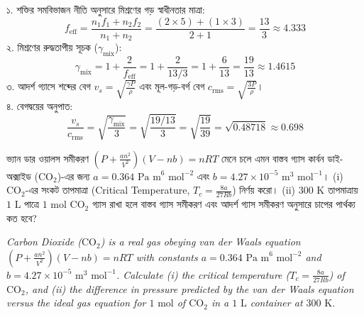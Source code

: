 \documentclass[12pt, a4paper]{article}
\begin{document}
{%
\begin{tcolorbox}[solutionbox={সমাধান (Solution)}]
\noindent
১. শক্তির সমবিভাজন নীতি অনুসারে মিশ্রণের গড় স্বাধীনতার মাত্রা:
\[ f_{\text{eff}} = \frac{n_1 f_1 + n_2 f_2}{n_1 + n_2} = \frac{(2 \times 5) + (1 \times 3)}{2 + 1} = \frac{13}{3} \approx 4.333 \]
২. মিশ্রণের রুদ্ধতাপীয় সূচক ($\gamma_{\text{mix}}$):
\[ \gamma_{\text{mix}} = 1 + \frac{2}{f_{\text{eff}}} = 1 + \frac{2}{13/3} = 1 + \frac{6}{13} = \frac{19}{13} \approx 1.4615 \]
৩. আদর্শ গ্যাসে শব্দের বেগ $v_s = \sqrt{\frac{\gamma P}{\rho}}$ এবং মূল-গড়-বর্গ বেগ $c_{\text{rms}} = \sqrt{\frac{3 P}{\rho}}$। \\
৪. বেগদ্বয়ের অনুপাত:
\[ \frac{v_s}{c_{\text{rms}}} = \sqrt{\frac{\gamma_{\text{mix}}}{3}} = \sqrt{\frac{19/13}{3}} = \sqrt{\frac{19}{39}} = \sqrt{0.48718} \approx 0.698 \]
\end{tcolorbox}

\vspace{1.5em}

\begin{tcolorbox}[questionbox={প্রশ্ন (Question) 4}]
\noindent
ভ্যান ডার ওয়ালস সমীকরণ $\left(P + \frac{a n^2}{V^2}\right)(V - n b) = n R T$ মেনে চলে এমন বাস্তব গ্যাস কার্বন ডাই-অক্সাইড ($\text{CO}_2$)-এর জন্য $a = 0.364\text{ Pa m}^6\text{ mol}^{-2}$ এবং $b = 4.27 \times 10^{-5}\text{ m}^3\text{ mol}^{-1}$। (i) $\text{CO}_2$-এর সংকট তাপমাত্রা (Critical Temperature, $T_c = \frac{8a}{27Rb}$) নির্ণয় করো। (ii) $300\text{ K}$ তাপমাত্রায় $1\text{ L}$ পাত্রে $1\text{ mol}$ $\text{CO}_2$ গ্যাস রাখা হলে বাস্তব গ্যাস সমীকরণ এবং আদর্শ গ্যাস সমীকরণ অনুসারে চাপের পার্থক্য কত হবে?

\vspace{0.8em}
\begin{english}
\noindent\textit{\color{darkgray}
Carbon Dioxide ($\text{CO}_2$) is a real gas obeying van der Waals equation $\left(P + \frac{a n^2}{V^2}\right)(V - n b) = n R T$ with constants $a = 0.364\text{ Pa m}^6\text{ mol}^{-2}$ and $b = 4.27 \times 10^{-5}\text{ m}^3\text{ mol}^{-1}$. Calculate (i) the critical temperature ($T_c = \frac{8a}{27Rb}$) of $\text{CO}_2$, and (ii) the difference in pressure predicted by the van der Waals equation versus the ideal gas equation for $1\text{ mol}$ of $\text{CO}_2$ in a $1\text{ L}$ container at $300\text{ K}$.
}
\end{english}
\end{tcolorbox}

}
\end{document}
